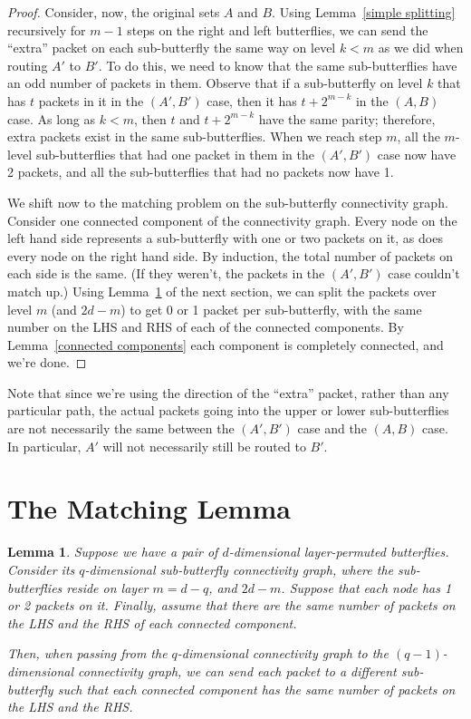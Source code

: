 \documentclass[12pt]{article}
\newtheorem{lemma}{Lemma}
\begin{document}
\begin{proof}
Consider, now, the original sets $A$ and $B$.  Using 
Lemma~\ref{simple splitting} recursively for $m-1$ steps
on the right and left
butterflies, we can send the ``extra'' packet on each sub-butterfly
the same way on level $k<m$ as we did when routing $A'$ to $B'$.  
To do this, we need to know that the same sub-butterflies have an
odd number of packets in them.
Observe that if a sub-butterfly on level $k$ that has $t$ packets in it
in the $(A', B')$ case, then it  
has $t+2^{m-k}$ in the $(A,B)$ case.  
As long as $k<m$, then
$t$ and $t+2^{m-k}$ have the same parity; therefore, extra packets
exist in the same sub-butterflies.  When we reach step $m$, all
the $m$-level sub-butterflies that had one packet in them in the $(A',B')$
case now have 2 packets, and all the sub-butterflies that had no
packets now have 1.

We shift now to the matching problem on the sub-butterfly connectivity graph.
Consider one connected component of the connectivity graph.
Every node on the left hand side represents a sub-butterfly with
one or two packets on it, as does
every node on the right hand side.  By induction, the total number of
packets on each side is the same.  (If they weren't, the packets in
the $(A',B')$ case couldn't match up.)
Using Lemma~\ref{matching} of the 
next section, we can split the packets over level $m$ (and $2d-m$)
to get 0 or 1 packet per sub-butterfly, with the same number on the 
LHS and RHS of each of the connected components.  By 
Lemma~\ref{connected components} each component is completely connected,
and we're done. \end{proof}

Note that since we're using the direction of the ``extra'' packet, rather
than any particular path, the actual packets going into the upper or
lower sub-butterflies are not necessarily the same between the $(A',B')$
case and the $(A,B)$ case.  In particular, $A'$ will not necessarily still
be routed to $B'$.

\section{The Matching Lemma}
\begin{lemma} \label{matching}
Suppose we have a pair of $d$-dimensional layer-permuted butterflies.
Consider its $q$-dimensional
sub-butterfly connectivity graph, where the sub-butterflies
reside on layer $m=d-q$, and $2d-m$.  Suppose
that each node has 1 or 2 packets
on it.  Finally, assume that there are the same number of packets
on the LHS and the RHS of each connected component.

Then, when passing from the $q$-dimensional connectivity graph to the 
$(q-1)$-dimensional connectivity graph, we can send each packet to
a different sub-butterfly such that each connected component has
the same number of packets on the LHS and the RHS.
\end{lemma}
\end{document}
